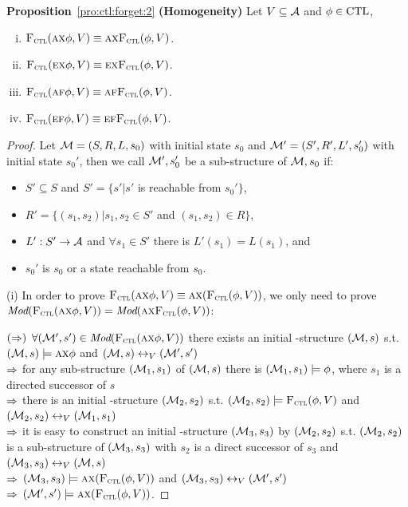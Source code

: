 \documentclass[letterpaper]{article} %
\begin{document}
\textbf{Proposition}~\ref{pro:ctl:forget:2} \textbf{(Homogeneity)}
Let $V\subseteq\cal A$ and $\phi \in \textrm{CTL}$,%
  \begin{enumerate}[(i)]
    \item ${\textsc{F}_{\textsc{ctl}}}(\textsc{a}\textsc{x}\phi,V)\equiv \textsc{a}\textsc{x} {\textsc{F}_{\textsc{ctl}}}(\phi,V)$.
    \item ${\textsc{F}_{\textsc{ctl}}}(\textsc{e}\textsc{x}\phi,V)\equiv\textsc{e}\textsc{x} {\textsc{F}_{\textsc{ctl}}}(\phi,V)$.
    \item ${\textsc{F}_{\textsc{ctl}}}(\textsc{a} \textsc{f}\phi,V)\equiv \textsc{a} \textsc{f} {\textsc{F}_{\textsc{ctl}}}(\phi,V)$.
    \item ${\textsc{F}_{\textsc{ctl}}}(\textsc{e}\textsc{f}\phi,V)\equiv\textsc{e}\textsc{f} {\textsc{F}_{\textsc{ctl}}}(\phi,V)$.
  \end{enumerate}
\begin{proof}
Let ${\cal M}=(S, R, L,s_0)$ with initial state $s_0$ and ${\cal M}'=(S', R', L',s_0')$ with initial state $s_0'$, then we call ${\cal M}', s_0'$ be a sub-structure of ${\cal M},s_0$ if:
\begin{itemize}
  \item $S' \subseteq S$ and $S'=\{s' | s'$ is reachable from $s_0'\}$,
  \item $R' =\{(s_1, s_2)| s_1, s_2 \in S'$ and $(s_1, s_2) \in R\}$,
  \item $L': S' \rightarrow {\cal A}$ and $\forall s_1 \in S'$ there is $L'(s_1) = L(s_1)$, and
  \item $s_0'$ is $s_0$ or a state reachable from $s_0$.
\end{itemize}

(i) In order to prove ${\textsc{F}_{\textsc{ctl}}}(\textsc{a} \textsc{x} \phi, V) \equiv \textsc{a} \textsc{x}({\textsc{F}_{\textsc{ctl}}}(\phi, V))$, we only need to prove $\textit{Mod}({\textsc{F}_{\textsc{ctl}}}(\textsc{a} \textsc{x} \phi, V)) = \textit{Mod}( \textsc{a}\textsc{x}{\textsc{F}_{\textsc{ctl}}}(\phi, V))$:

$(\Rightarrow)$ $\forall ({\cal M}', s') \in \textit{Mod}({\textsc{F}_{\textsc{ctl}}}(\textsc{a} \textsc{x} \phi, V))$ there exists an initial \MPK-structure $({\cal M}, s)$ s.t. $({\cal M}, s)\models \textsc{a} \textsc{x} \phi$ and $({\cal M}, s) \leftrightarrow_V ({\cal M}',s')$\\
$\Rightarrow$ for any sub-structure $({\cal M}_1, s_1)$ of $({\cal M}, s)$ there is $({\cal M}_1, s_1) \models \phi$, where $s_1$ is a directed successor of $s$ \\
$\Rightarrow$ there is an initial \MPK-structure $({\cal M}_2, s_2)$ s.t. $({\cal M}_2, s_2) \models {\textsc{F}_{\textsc{ctl}}}(\phi,V)$ and $({\cal M}_2, s_2) \leftrightarrow_V ({\cal M}_1,s_1)$\\
$\Rightarrow$ it is easy to construct an initial \MPK-structure $({\cal M}_3, s_3)$ by $({\cal M}_2, s_2)$ s.t. $({\cal M}_2, s_2)$ is a sub-structure of $({\cal M}_3, s_3)$ with $s_2$ is a direct successor of $s_3$ and $({\cal M}_3, s_3) \leftrightarrow_V ({\cal M},s)$\\
$\Rightarrow$ $({\cal M}_3, s_3) \models \textsc{a} \textsc{x} ({\textsc{F}_{\textsc{ctl}}}(\phi,V))$ and $({\cal M}_3, s_3) \leftrightarrow_V ({\cal M}',s')$\\
$\Rightarrow$ $({\cal M}', s') \models \textsc{a} \textsc{x} ({\textsc{F}_{\textsc{ctl}}}(\phi,V))$.


\end{proof}
\end{document}
